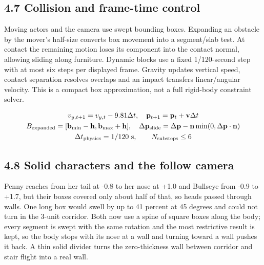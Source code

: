 \documentclass[12pt,a4paper]{article}
\begin{document}
\subsection*{4.7 Collision and frame-time control}
Moving actors and the camera use swept bounding boxes. Expanding an obstacle by the mover's half-size converts box movement into a segment/slab test. At contact the remaining motion loses its component into the contact normal, allowing sliding along furniture. Dynamic blocks use a fixed 1/120-second step with at most six steps per displayed frame. Gravity updates vertical speed, contact separation resolves overlaps and an impact transfers linear/angular velocity. This is a compact box approximation, not a full rigid-body constraint solver.

{\small\begin{equation}\begin{gathered}
v_{y,t+1}=v_{y,t}-9.81\Delta t,\quad\mathbf p_{t+1}=\mathbf p_t+\mathbf v\Delta t\\
B_{\rm expanded}=[\mathbf b_{\min}-\mathbf h,\mathbf b_{\max}+\mathbf h],\quad
\Delta\mathbf p_{\rm slide}=\Delta\mathbf p-\mathbf n\min(0,\Delta\mathbf p\cdot\mathbf n)\\
\Delta t_{\rm physics}=1/120\text{ s},\qquad N_{\rm substeps}\le6
\end{gathered}\label{eq:29}\end{equation}}
\subsection*{4.8 Solid characters and the follow camera}
Penny reaches from her tail at -0.8 to her nose at +1.0 and Bullseye from -0.9 to +1.7, but their boxes covered only about half of that, so heads passed through walls. One long box would swell by up to 41 percent at 45 degrees and could not turn in the 3-unit corridor. Both now use a spine of square boxes along the body; every segment is swept with the same rotation and the most restrictive result is kept, so the body stops with its nose at a wall and turning toward a wall pushes it back. A thin solid divider turns the zero-thickness wall between corridor and stair flight into a real wall.
\end{document}
